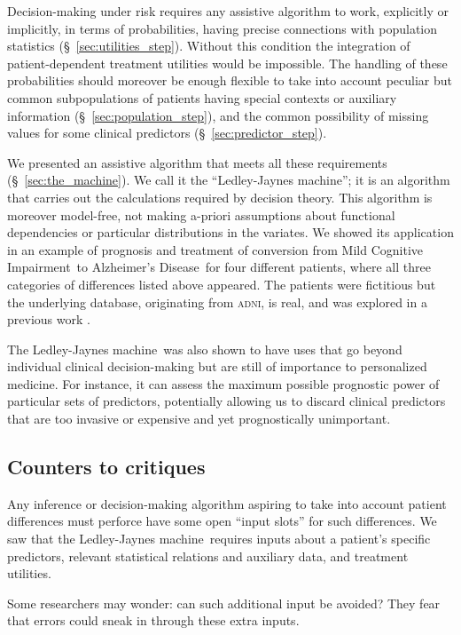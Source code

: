 \documentclass[utf8]{FrontiersinHarvard} %
\newcommand*{\sect}{\S}%
\renewcommand*{\|}[1][]{\nonscript\:#1\vert\nonscript\:\mathopen{}}
\newcommand*{\ad}{Alzheimer's Disease}
\newcommand*{\mci}{Mild Cognitive Impairment}
\newcommand*{\ljm}{Ledley-Jaynes machine}
\newcommand*{\adni}{\textsc{adni}}
\begin{document}
Decision-making under risk requires any assistive algorithm to work, explicitly or implicitly, in terms of probabilities, having precise connections with population statistics (\sect~\ref{sec:utilities_step}). Without this condition the integration of patient-dependent treatment utilities would be impossible. The handling of these probabilities should moreover be enough flexible to take into account peculiar but common subpopulations of patients having special contexts or auxiliary information (\sect~\ref{sec:population_step}), and the common possibility of missing values for some clinical predictors (\sect~\ref{sec:predictor_step}).

We presented an assistive algorithm that meets all these requirements (\sect~\ref{sec:the_machine}). We call it the \enquote{\ljm}; it is an algorithm that carries out the calculations required by decision theory. This algorithm is moreover model-free, not making a-priori assumptions about functional dependencies or particular distributions in the variates. We showed its application in an example of prognosis and treatment of conversion from \mci\ to \ad\ for four different patients, where all three categories of differences listed above appeared. The patients were fictitious but the underlying database, originating from \adni, is real, and was explored in a previous work \citep{ryeetal2022}.

The \ljm\ was also shown to have uses that go beyond individual clinical decision-making but are still of importance to personalized medicine. For instance, it can assess the maximum possible prognostic power of particular sets of predictors, potentially allowing us to discard clinical predictors that are too invasive or expensive and yet prognostically unimportant.

\subsection{Counters to critiques}
\label{sec:critics}

Any inference or decision-making algorithm aspiring to take into account patient differences must perforce have some open \enquote{input slots} for such differences. We saw that the \ljm\ requires inputs about a patient's specific predictors, relevant statistical relations and auxiliary data, and treatment utilities.

Some researchers may wonder: can such additional input be avoided? They fear that errors could sneak in through these extra inputs.
\end{document}
